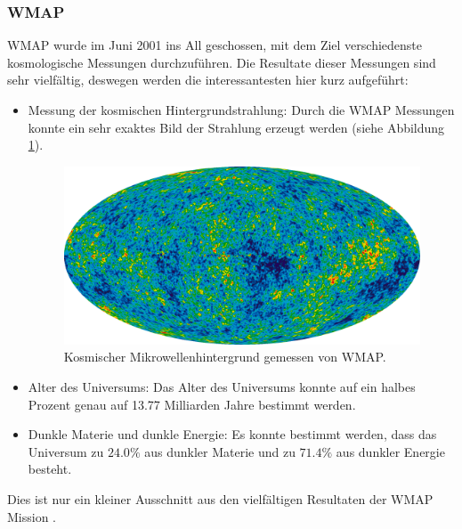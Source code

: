 \subsubsection{\ac{WMAP}}
\ac{WMAP} wurde im Juni 2001 ins All geschossen, mit dem Ziel verschiedenste 
kosmologische Messungen durchzuführen.
Die Resultate dieser Messungen sind sehr vielfältig, deswegen werden die 
interessantesten hier kurz aufgeführt:
\begin{itemize}
	\item Messung der kosmischen Hintergrundstrahlung: Durch die \ac{WMAP} 
	Messungen konnte ein sehr exaktes Bild der Strahlung erzeugt werden (siehe 
	Abbildung \ref{fig:CMB_WMAP}).
	\begin{figure}
		\includegraphics[width=\linewidth]{cmb/images/CMB_WMAP.png}
		\caption{Kosmischer Mikrowellenhintergrund gemessen von \ac{WMAP}.}
		\label{fig:CMB_WMAP}
	\end{figure}
	\item Alter des Universums: Das Alter des Universums konnte auf ein halbes 
	Prozent genau auf 13.77 Milliarden Jahre bestimmt werden.
	\item Dunkle Materie und dunkle Energie: Es konnte bestimmt werden, dass 
	das Universum zu $24.0 \%$ aus dunkler Materie und zu $71.4\%$ aus 
	dunkler Energie besteht.
%
%
%
%
\end{itemize}
Dies ist nur ein kleiner Ausschnitt aus den vielfältigen Resultaten der 
\ac{WMAP} Mission \cite{cmb:WMAP}.

